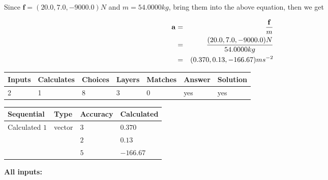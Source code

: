 \documentclass[12pt]{article}
\begin{document}
Since $\mathbf{f}= %
(20.0 , 7.0 , -9000.0) N$
and $m= %
54.0000kg$, bring them into the above equation, then we get
 
\begin{eqnarray*}
\mathbf{a}&=&\frac{\mathbf{f}}m  \\
&=&\frac{ %
(20.0 , 7.0 , -9000.0) N}{ %
54.0000kg}  \\
&=& %
(0.370 , 0.13 , -166.67) ms^{-2}
\end{eqnarray*}
 
 
 
\noindent{}
 
 

 
\vspace{0.3in}
   
   
   
   
\noindent\begin{tabular}{|l|l|l|l|l|l|l|}
 \hline
Inputs & Calculates & Choices & Layers & Matches & Answer & Solution \\ \hline
           2  & 
           1  & 
           8
  & 
           3  & 
           0  & 
  yes & 
  yes 
  \\ \hline
 \end{tabular}
   
   
   
   
\noindent{}
   
   
  
  
\noindent\begin{tabular}{|l|l|l|l|}
\hline
 Sequential & Type & Accuracy & Calculated \\ 
\hline
 
 
  Calculated $            1 $ & vector &  
  $            3  $ 
 &  $ 0.370 $ 
 \\    
  & & 
  $            2  $ 
 &  $ 0.13 $ 
 \\    
  & & 
  $            5  $ 
 &  $ -166.67 $ 
 \\  \hline  
 \end{tabular}
   
   
   
   
\noindent\vspace{0.1in}\hspace{-0.08in} {\textbf{\Large{All inputs: }}}
   
   
  
\end{document}
